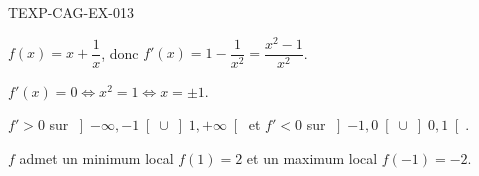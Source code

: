 \begin{corrige}{TEXP-CAG-EX-013}

$f(x) = x + \dfrac{1}{x}$, donc $f'(x) = 1 - \dfrac{1}{x^2} = \dfrac{x^2-1}{x^2}$.


$f'(x) = 0 \iff x^2 = 1 \iff x = \pm 1$.

$f' > 0$ sur $\left]-\infty, -1\right[ \cup \left]1, +\infty\right[$ et $f' < 0$ sur $\left]-1, 0\right[ \cup \left]0, 1\right[$.

$f$ admet un minimum local $f(1) = 2$ et un maximum local $f(-1) = -2$.

\end{corrige}
